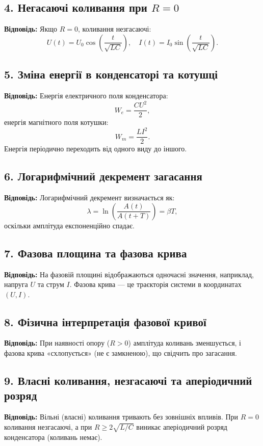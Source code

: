 \documentclass[12pt,a4paper]{article}
\begin{document}
    \subsection*{4. Негасаючі коливання при $R=0$}
    \textbf{Відповідь:}  
    Якщо $R=0$, коливання незгасаючі:
    \[
    U(t)=U_0\cos\left(\frac{t}{\sqrt{LC}}\right),\quad I(t)=I_0\sin\left(\frac{t}{\sqrt{LC}}\right).
    \]

    \subsection*{5. Зміна енергії в конденсаторі та котушці}
    \textbf{Відповідь:}  
    Енергія електричного поля конденсатора:
    \[
    W_e=\frac{CU^2}{2},
    \]
    енергія магнітного поля котушки:
    \[
    W_m=\frac{LI^2}{2}.
    \]
    Енергія періодично переходить від одного виду до іншого.

    \subsection*{6. Логарифмічний декремент загасання}
    \textbf{Відповідь:}  
    Логарифмічний декремент визначається як:
    \[
    \lambda=\ln\!\left(\frac{A(t)}{A(t+T)}\right)=\beta T,
    \]
    оскільки амплітуда експоненційно спадає.

    \subsection*{7. Фазова площина та фазова крива}
    \textbf{Відповідь:}  
    На фазовій площині відображаються одночасні значення, наприклад, напруга $U$ та струм $I$. Фазова крива --- це траєкторія системи в координатах $(U,I)$.

    \subsection*{8. Фізична інтерпретація фазової кривої}
    \textbf{Відповідь:}  
    При наявності опору ($R>0$) амплітуда коливань зменшується, і фазова крива «схлопується» (не є замкненою), що свідчить про загасання.

    \subsection*{9. Власні коливання, незгасаючі та аперіодичний розряд}
    \textbf{Відповідь:}  
    Вільні (власні) коливання тривають без зовнішніх впливів. При $R=0$ коливання незгасаючі, а при $R\geq2\sqrt{L/C}$ виникає аперіодичний розряд конденсатора (коливань немає).
\end{document}
